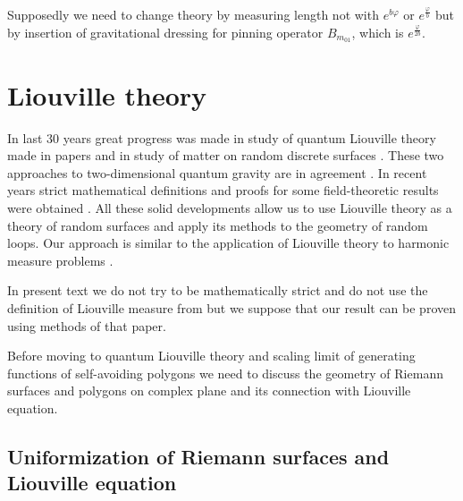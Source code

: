 \documentclass[12pt]{article}
\begin{document}
Supposedly we need to change theory by measuring length not with $e^{b\varphi}$ or
$e^{\frac{\varphi}{b}}$ but by insertion of gravitational dressing for pinning operator
$B_{m_{01}}$, which is $e^{\frac{\varphi}{2b}}$.

\section{Liouville theory}
\label{sec:liouville-theory}



In last 30 years great progress was made in study of quantum Liouville theory made in papers
\cite{fateev2000boundary,zamolodchikov1996conformal,knizhnik1988fractal} and in study of matter on
random discrete surfaces
\cite{kazakov1986ising,duplantier1990geometrical,gaudin1989n,duplantier1988conformal}. These two
approaches to two-dimensional quantum gravity are in agreement
\cite{kostov2004boundary,kostov2003boundary}. In recent years strict mathematical definitions and proofs for some
field-theoretic results were obtained \cite{duplantier2011liouville,garban2012quantum}. All these
solid developments allow us to use Liouville theory as a theory of random surfaces and apply its
methods to the geometry of random loops. Our approach is similar to the application of Liouville
theory to harmonic measure problems \cite{duplantier2000conformally}. 

In present text we do not try to be mathematically strict and do not use the definition of Liouville
measure from \cite{duplantier2011liouville} but we suppose that our result can be proven using
methods of that paper.

Before moving to quantum Liouville theory and scaling limit of generating functions of self-avoiding
polygons we need to discuss the geometry of Riemann surfaces and polygons on complex plane and its
connection with Liouville equation. 

\subsection{Uniformization of Riemann surfaces and Liouville equation}
\label{sec:unif-riem-surf}
\end{document}
